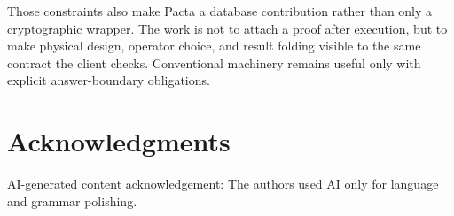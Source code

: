 \documentclass[conference]{IEEEtran}
\newcommand{\sys}{Pacta\xspace}
\begin{document}
Those constraints also make \sys a database contribution rather than only a cryptographic wrapper. The work is not to attach a proof after execution, but to make physical design, operator choice, and result folding visible to the same contract the client checks. Conventional machinery remains useful only with explicit answer-boundary obligations.

\clearpage
\section*{Acknowledgments}
AI-generated content acknowledgement: The authors used AI only for language and grammar polishing.



\end{document}
